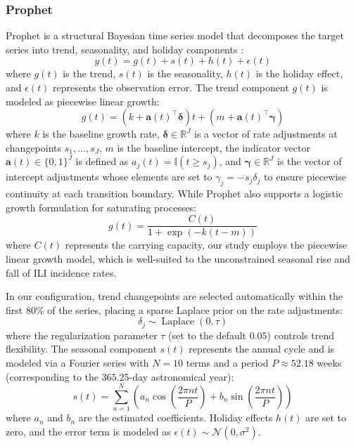 \subsubsection{Prophet}
Prophet is a structural Bayesian time series model that decomposes the target series into trend, seasonality, and holiday components \cite{prophet}:
\begin{equation}
y(t) = g(t) + s(t) + h(t) + \epsilon(t)
\end{equation}
where $g(t)$ is the trend, $s(t)$ is the seasonality, $h(t)$ is the holiday effect, and $\epsilon(t)$ represents the observation error. The trend component $g(t)$ is modeled as piecewise linear growth:
\begin{equation}
g(t) = (k + \mathbf{a}(t)^\top \boldsymbol{\delta}) t + (m + \mathbf{a}(t)^\top \boldsymbol{\gamma})
\end{equation}
where $k$ is the baseline growth rate, $\boldsymbol{\delta} \in \mathbb{R}^J$ is a vector of rate adjustments at changepoints $s_1, \dots, s_J$, $m$ is the baseline intercept, the indicator vector $\mathbf{a}(t) \in \{0, 1\}^J$ is defined as $a_j(t) = \mathbb{I}(t \ge s_j)$, and $\boldsymbol{\gamma} \in \mathbb{R}^J$ is the vector of intercept adjustments whose elements are set to $\gamma_j = -s_j \delta_j$ to ensure piecewise continuity at each transition boundary. While Prophet also supports a logistic growth formulation for saturating processes:
\begin{equation}
g(t) = \frac{C(t)}{1 + \exp(-k(t - m))}
\end{equation}
where $C(t)$ represents the carrying capacity, our study employs the piecewise linear growth model, which is well-suited to the unconstrained seasonal rise and fall of ILI incidence rates.

In our configuration, trend changepoints are selected automatically within the first 80\% of the series, placing a sparse Laplace prior on the rate adjustments:
\begin{equation}
\delta_j \sim \operatorname{Laplace}(0, \tau)
\end{equation}
where the regularization parameter $\tau$ (set to the default $0.05$) controls trend flexibility. The seasonal component $s(t)$ represents the annual cycle and is modeled via a Fourier series with $N=10$ terms and a period $P \approx 52.18$ weeks (corresponding to the $365.25$-day astronomical year):
\begin{equation}
s(t) = \sum_{n=1}^N \left( a_n \cos\left(\frac{2\pi n t}{P}\right) + b_n \sin\left(\frac{2\pi n t}{P}\right) \right)
\end{equation}
where $a_n$ and $b_n$ are the estimated coefficients. Holiday effects $h(t)$ are set to zero, and the error term is modeled as $\epsilon(t) \sim \mathcal{N}(0, \sigma^2)$.

